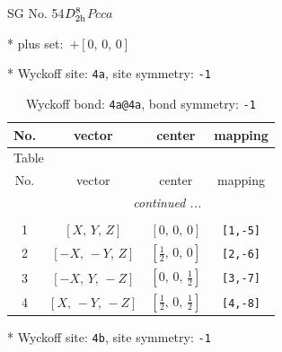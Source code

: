 \documentclass[fleqn,8pt]{jsarticle}
\begin{document}
\setcounter{MaxMatrixCols}{32}

\renewcommand{\tablename}{Table~}
\renewcommand{\figurename}{Figure~}
\begin{center}
\LARGE
SG No. 54\quad$D_{\rm 2h}^{8}$\quad$Pcca$\quad[ orthorhombic ]
\end{center}

* plus set:\,\,\,$+\left[ 0,\, 0,\, 0 \right]$


* Wyckoff site: {\tt 4a}, site symmetry: {\tt -1}
\renewcommand{\arraystretch}{1.2}
\begin{longtable}{cccc}
\caption{Wyckoff bond: {\tt 4a@4a}, bond symmetry: {\tt -1}}
 \\
 \hline \hline
No. & vector & center & mapping \\ \hline \endfirsthead

\multicolumn{3}{l}{\tablename\ \thetable{}} \\
 \hline \hline
No. & vector & center & mapping \\ \hline \endhead

 \hline \hline
\multicolumn{3}{r}{\footnotesize\it continued ...} \\ \endfoot

 \hline \hline
\multicolumn{3}{r}{} \\ \endlastfoot

1 & $\left[ X,\, Y,\, Z \right]$ & $\left[ 0,\, 0,\, 0 \right]$ & {\tt [1,-5]} \\ \hline
2 & $\left[ - X,\, - Y,\, Z \right]$ & $\left[ \frac{1}{2},\, 0,\, 0 \right]$ & {\tt [2,-6]} \\ \hline
3 & $\left[ - X,\, Y,\, - Z \right]$ & $\left[ 0,\, 0,\, \frac{1}{2} \right]$ & {\tt [3,-7]} \\ \hline
4 & $\left[ X,\, - Y,\, - Z \right]$ & $\left[ \frac{1}{2},\, 0,\, \frac{1}{2} \right]$ & {\tt [4,-8]} \\
\end{longtable}
* Wyckoff site: {\tt 4b}, site symmetry: {\tt -1}
\renewcommand{\arraystretch}{1.2}
\end{document}
